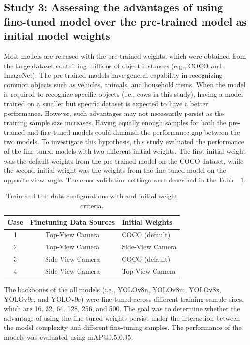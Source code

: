 \subsection*{Study 3: Assessing the advantages of using fine-tuned model over the pre-trained model as initial model weights}

Most models are released with the pre-trained weights, which were obtained from the large dataset containing millions of object instances (e.g., COCO\cite{lin2014microsoft} and ImageNet\cite{deng2009imagenet}). The pre-trained models have general capability in recognizing common objects such as vehicles, animals, and household items. When the model is required to recognize specific objects (i.e., cows in this study), having a model trained on a smaller but specific dataset is expected to have a better performance. However, such advantages may not necessarily persist as the training sample size increases. Having equally enough samples for both the pre-trained and fine-tuned models could diminish the performance gap between the two models. To investigate this hypothesis, this study evaluated the performance of the fine-tuned models with two different initial weights. The first initial weight was the default weights from the pre-trained model on the COCO dataset, while the second initial weight was the weights from the fine-tuned model on the opposite view angle. The cross-validation settings were described in the Table ~\ref{tab:configuration}.

\begin{table}[h]
    \centering
    \begin{tabular}{ccl}
        \toprule
        \textbf{Case} &\textbf{Finetuning Data Sources} & \textbf{Initial Weights} \\
        \midrule
        1 &Top-View Camera & COCO (default) \\
        2 &Top-View Camera & Side-View Camera \\
        3 &Side-View Camera & COCO (default) \\
        4 &Side-View Camera & Top-View Camera \\
        \bottomrule
    \end{tabular}
    \vspace{3mm}
    \caption{Train and test data configurations with and initial weight criteria.}
    \label{tab:configuration}
\end{table}

The backbones of the all models (i.e., YOLOv8n, YOLOv8m, YOLOv8x, YOLOv9c, and YOLOv9e) were fine-tuned across different training sample sizes, which are 16, 32, 64, 128, 256, and 500. The goal was to determine whether the advantage of using the fine-tuned weights persist under the interaction between the model complexity and different fine-tuning samples. The performance of the models was evaluated using $\text{mAP@{0.5:0.95}}$.




